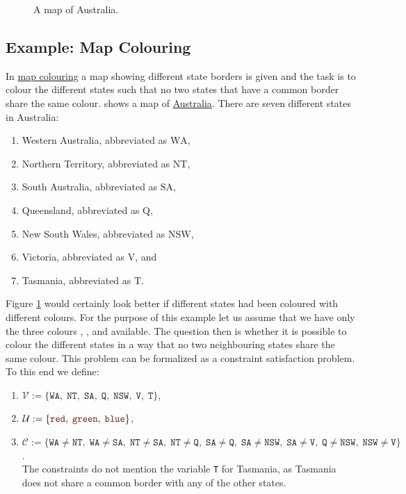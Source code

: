 \begin{figure}[!ht]
  \centering
  \caption{A map of Australia.}
  \label{fig:australia.pdf}
\end{figure}

\subsection{Example: Map Colouring}
In \href{https://en.wikipedia.org/wiki/Four_color_theorem}{map colouring}  a map showing
different state 
borders is given and the task is to colour the different states such that no two states that have a common
border share the same colour.   shows a map of
\href{https://www.nationsonline.org/maps/australia-map-1400px.jpg}{Australia}.  There are seven different 
states in Australia:
\begin{enumerate}
\item Western Australia, abbreviated as $\mathrm{WA}$,
\item Northern Territory, abbreviated as $\mathrm{NT}$,
\item South Australia, abbreviated as $\mathrm{SA}$,
\item Queensland, abbreviated as $\mathrm{Q}$,
\item New South Wales, abbreviated as $\mathrm{NSW}$,
\item Victoria, abbreviated as $\mathrm{V}$, and
\item Tasmania, abbreviated as $\mathrm{T}$.
\end{enumerate}
Figure \ref{fig:australia.pdf} would certainly look better if different states had been coloured with different
colours.  For the purpose of 
this example let us assume that we have only the three colours , , and  
available.  The question then is whether it is  
possible to colour the different states in a way that no two neighbouring states share the same colour.  This
problem can be formalized as a constraint satisfaction problem.  To this end we define:
\begin{enumerate}
\item $\mathcal{V} := \{ \mathtt{WA},\; \mathtt{NT},\; \mathtt{SA},\; \mathtt{Q},\; \mathtt{NSW},\; \mathtt{V},\; \mathtt{T} \}$,
\item $\mathcal{U} := \{ \mytt{red},\; \mytt{green},\; \mytt{blue} \}$,
\item $\mathcal{C} :=  
      \bigl\{ \mathtt{WA} \not= \mathtt{NT},\;\mathtt{WA} \not= \mathtt{SA},\;
                 \mathtt{NT} \not= \mathtt{SA},\;\mathtt{NT} \not= \mathtt{Q},\;
                 \mathtt{SA} \not= \mathtt{Q},\; \mathtt{SA} \not= \mathtt{NSW},\;\mathtt{SA} \not= \mathtt{V},\;
                 \mathtt{Q}  \not= \mathtt{NSW},\;
                 \mathtt{NSW}\not= \mathtt{V}
       \bigr\}
       $.
       \\[0.1cm]
       The constraints do not mention the variable \texttt{T} for Tasmania, as Tasmania does not share a common
       border with any of the other states.
\end{enumerate}
